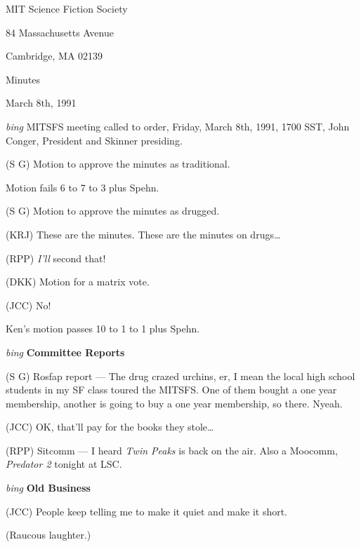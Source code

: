 \setlength{\topmargin}{-0.5in}
\setlength{\oddsidemargin}{0.0in}
\setlength{\evensidemargin}{0.0in}
\setlength{\textheight}{9in}
\setlength{\textwidth}{6.5in}



\begin{center}
MIT Science Fiction Society

84 Massachusetts Avenue

Cambridge, MA 02139

\vspace{0.2in}
Minutes

March 8th, 1991

\end{center}

\vspace{0.15in}
{\em bing\/}  MITSFS meeting called to order, Friday, March 8th, 1991,
1700 SST, John Conger, President and Skinner presiding.

(S G) Motion to approve the minutes as traditional.

Motion fails 6 to 7 to 3 plus Spehn.

(S G) Motion to approve the minutes as drugged.

(KRJ) These are the minutes.  These are the minutes on drugs\ldots

(RPP) {\em I'll\/} second that!

(DKK) Motion for a matrix vote.

(JCC) No!

Ken's motion passes 10 to 1 to 1 plus Spehn.

\vspace{0.15in}
{\em bing\/} {\bf Committee Reports\/}

(S G) Rosfap report --- The drug crazed urchins, er, I mean the local high
school students in my SF class toured the {\sc MITSFS}.  One of them bought a
one year membership, another is going to buy a one year membership, so there.
Nyeah.

(JCC) OK, that'll pay for the books they stole\ldots

(RPP) Sitcomm --- I heard {\em Twin Peaks\/} is back on the air.  Also a
Moocomm, {\em Predator 2\/} tonight at LSC.

\vspace{.15in}
{\em bing\/} {\bf Old Business\/}

(JCC) People keep telling me to make it quiet and make it short.

(Raucous laughter.)

